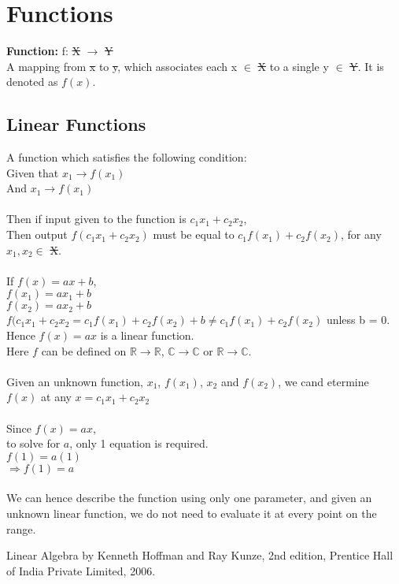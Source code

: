 \documentclass[12pt]{article}
\theoremstyle{definition}
\theoremstyle{plain}
\newcommand{\R}{\mathbb{R}}
\newcommand{\C}{\mathbb{C}}
\begin{document}
\section{Functions}
\textbf{Function:} f:   \sout{X} $\rightarrow$ \sout{Y}
\\A mapping from \sout{x} to \sout{y}, which associates each x $\in$ \sout{X} to a single y $\in$ \sout{Y}. It is denoted as $f(x)$.

\subsection{Linear Functions}
A function which satisfies the following condition:
\\Given that $x_1 \rightarrow f(x_1)$
\\And $x_1 \rightarrow f(x_1)$
\\\\Then if input given to the function is $c_1x_1 + c_2x_2$,
\\Then output $f(c_1x_1 + c_2x_2)$ must be equal to $c_1f(x_1) + c_2f(x_2)$, for any $x_1, x_2 \in$ \sout{X}.
\\\\If $f(x)= ax+b$,
\\$f(x_1)=ax_1+b$
\\$f(x_2)=ax_2+b$
\\$f(c_1x_1 + c_2x_2=c_1f(x_1) + c_2f(x_2) + b \neq c_1f(x_1) + c_2f(x_2)$ unless b = 0.
\\Hence $f(x) = ax$ is a linear function.
\\Here $f$ can be defined on $\R \rightarrow \R$, $\C \rightarrow \C$ or $\R \rightarrow \C$.
\\\\Given an unknown function, $x_1$, $f(x_1)$, $x_2$ and $f(x_2)$, we cand etermine $f(x)$ at any $x= c_1x_1+c_2x_2$
\\\\Since $f(x)=ax$,
\\to solve for $a$, only 1 equation is required.
\\$f(1)=a(1)$
\\$\Rightarrow f(1)=a$
\\\\We can hence describe the function using only one parameter, and given an unknown linear function, we do not need to evaluate it at every point on the range.

\begin{thebibliography}{1}
Linear Algebra  by  Kenneth Hoffman and Ray Kunze, 2nd edition, Prentice Hall of India Private Limited, 2006.

\end{thebibliography}
\end{document}
